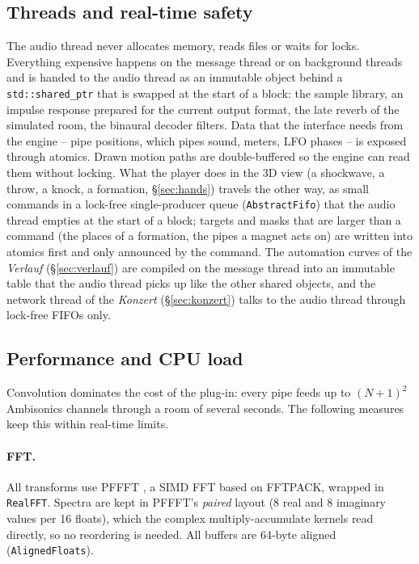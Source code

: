 \documentclass[11pt,a4paper,parskip=half,DIV=11,toc=bibliography]{scrartcl}
\newcommand{\ui}[1]{\emph{#1}}                 %
\newcommand{\code}[1]{\texttt{#1}}
\newcommand{\fn}[1]{\mbox{\texttt{#1}}}
\begin{document}
\subsection{Threads and real-time safety}
The audio thread never allocates memory, reads files or waits for locks. Everything expensive happens
on the message thread or on background threads and is handed to the audio thread as an immutable
object behind a \code{std::shared\_ptr} that is swapped at the start of a block: the sample library,
an impulse response prepared for the current output format, the late reverb of the simulated room, the
binaural decoder filters. Data that the interface needs from the engine -- pipe positions, which pipes
sound, meters, LFO phases -- is exposed through atomics. Drawn motion paths are double-buffered so the
engine can read them without locking. What the player does in the 3D view (a shockwave, a throw, a knock, a formation, \S\ref{sec:hands})
travels the other way, as small commands in a lock-free single-producer queue (\fn{AbstractFifo}) that the audio thread empties at the start
of a block; targets and masks that are larger than a command (the places of a formation, the pipes a magnet acts on) are written into atomics
first and only announced by the command. The automation curves of the \ui{Verlauf} (\S\ref{sec:verlauf}) are compiled on the message thread into an
immutable table that the audio thread picks up like the other shared objects, and the network thread of the \ui{Konzert} (\S\ref{sec:konzert}) talks to
the audio thread through lock-free FIFOs only.

\subsection{Performance and CPU load}
\label{sec:perf}
Convolution dominates the cost of the plug-in: every pipe feeds up to $(N+1)^2$ Ambisonics channels
through a room of several seconds. The following measures keep this within real-time limits.

\paragraph{FFT.} All transforms use PFFFT \citep{pffft}, a SIMD FFT based on FFTPACK, wrapped in
\fn{RealFFT}. Spectra are kept in PFFFT's \emph{paired} layout (8 real and 8 imaginary values per
16 floats), which the complex multiply-accumulate kernels read directly, so no reordering is needed. All
buffers are 64-byte aligned (\fn{AlignedFloats}).
\end{document}

